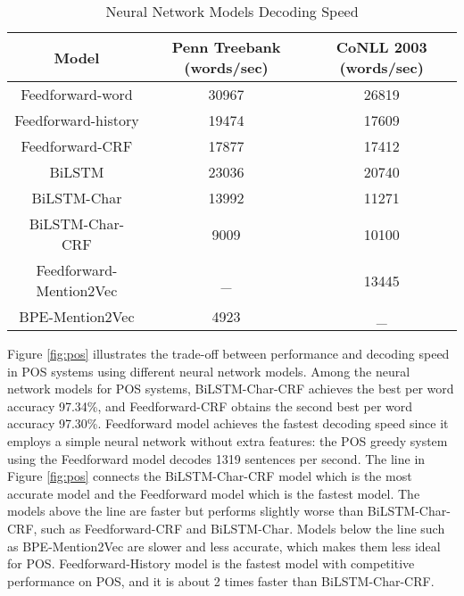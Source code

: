 \begin{table}[]
\centering
\caption{Neural Network Models Decoding Speed}
\label{table:my-label2}
\begin{tabular}{|c|c|c|}
\hline
Model & Penn Treebank (words/sec) & CoNLL 2003 (words/sec) \\ \hline
Feedforward-word    & 30967    & 26819    \\ \hline
Feedforward-history & 19474    & 17609     \\ \hline
Feedforward-CRF     & 17877    & 17412     \\ \hline
BiLSTM              & 23036    & 20740       \\ \hline
BiLSTM-Char         & 13992    & 11271           \\ \hline
BiLSTM-Char-CRF     & 9009     & 10100        \\ \hline
Feedforward-Mention2Vec     & _      & 13445              \\ \hline
BPE-Mention2Vec     & 4923  &  _               \\ \hline   
\end{tabular}
\end{table}

Figure \ref{fig:pos} illustrates the trade-off between performance and decoding speed in POS systems using different neural network models. Among the neural network models for POS systems, BiLSTM-Char-CRF achieves the best per word accuracy 97.34\%, and Feedforward-CRF obtains the second best per word accuracy 97.30\%. Feedforward model achieves the fastest decoding speed since it employs a simple neural network without extra features: the POS greedy system using the Feedforward model decodes 1319 sentences per second. The line in Figure \ref{fig:pos} connects the BiLSTM-Char-CRF model which is the most accurate model and the Feedforward model which is the fastest model. The models above the line are faster but performs slightly worse than BiLSTM-Char-CRF, such as Feedforward-CRF and BiLSTM-Char. Models below the line such as BPE-Mention2Vec are slower and less accurate, which makes them less ideal for POS. Feedforward-History model is the fastest model with competitive performance on POS, and it is about 2 times faster than BiLSTM-Char-CRF.

